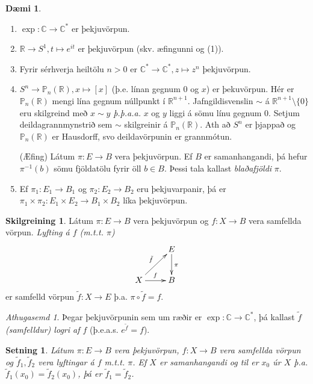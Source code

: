 \documentclass[a4paper,icelandic]{book}
\theoremstyle{definition}
\newtheorem{skilgr}{Skilgreining}[section]
\newtheorem{daemi}{Dæmi}[section]
\theoremstyle{plain}
\newtheorem{setn}{Setning}[section]
\theoremstyle{remark}
\newtheorem*{ath}{Athugasemd}
\newcommand{\R}{\mathbb{R}} %
\newcommand{\C}{\mathbb{C}} %
\begin{document}
\begin{daemi}
  \begin{enumerate}[(1)]
    \item $\exp:\C\to\C^*$ er þekjuvörpun.
    \item $\R\to S^1, t\mapsto e^{it}$ er þekjuvörpun (skv. æfingunni og
      (1)). 
    \item Fyrir sérhverja heiltölu $n>0$ er $\C^*\to\C^*,z\mapsto z^n$
      þekjuvörpun.
    \item $S^n\to\mathbb P_n(\mathbb R), x\mapsto [x]$ (þ.e. línan
      gegnum 0 og $x$) er þekuvörpun. Hér er $\mathbb P_n(\R)$ mengi
      lína gegnum núllpunkt í $\R^{n+1}$. Jafngildisvenslin $\sim$ á
      $\R^{n+1}\setminus\{0\}$ eru skilgreind með $x\sim y$
      \emph{þ.þ.a.a.} $x$ og $y$ liggi á sömu línu gegnum $0$. Setjum
      deildagrannmynstrið sem $\sim$ skilgreinir á $\mathbb
      P_n(\R)$. Ath að $S^n$ er þjappað og $\mathbb P_n(\R)$ er
      Hausdorff, svo deildavörpunin er grannmótun. 
      
      (Æfing) Látum $\pi:E\to B$ vera þekjuvörpun. Ef $B$ er
      samanhangandi, þá hefur $\pi^{-1}(b)$ sömu fjöldatölu fyrir öll
      $b\in B$. Þessi tala kallast \emph{blaðafjöldi}
      $\pi$.
    \item Ef $\pi_1:E_1\to B_1$ og $\pi_2:E_2\to B_2$ eru þekjuvarpanir,
      þá er $\pi_1\times\pi_2: E_1\times E_2\to B_1\times B_2$ líka
      þekjuvörpun. 
  \end{enumerate}
\end{daemi}
\begin{skilgr}
  Látum $\pi:E\to B$ vera þekjuvörpun og $f:X\to B$ vera samfellda
  vörpun. \emph{Lyfting á $f$ (m.t.t. $\pi$)}
  \[\xymatrix{
  & E\ar[d]^\pi
  \\
  X\ar[r]^f\ar[ur]^{\tilde f}
  & B
  }\]
  er samfelld vörpun $\tilde f:X\to E$ þ.a. $\pi\circ\tilde f=f$.
\end{skilgr}
\begin{ath}
  Þegar þekjuvörpunin sem um ræðir er $\exp:\C\to\C^*$, þá kallast
  $\tilde f$ \emph{(samfelldur) logri af $f$} (þ.e.a.s.
  $e^{\tilde f} = f$).
\end{ath}
\begin{setn}
  Látum $\pi:E\to B$ vera þekjuvörpun, $f:X\to B$ vera samfellda vörpun
  og $\tilde f_1,\tilde f_2$ vera lyftingar á $f$ m.t.t. $\pi$. Ef $X$
  er samanhangandi og til er $x_0$ úr $X$ þ.a. $\tilde f_1(x_0)=\tilde
  f_2(x_0)$, þá er $\tilde f_1 = \tilde f_2$. 
\end{setn}
\end{document}
